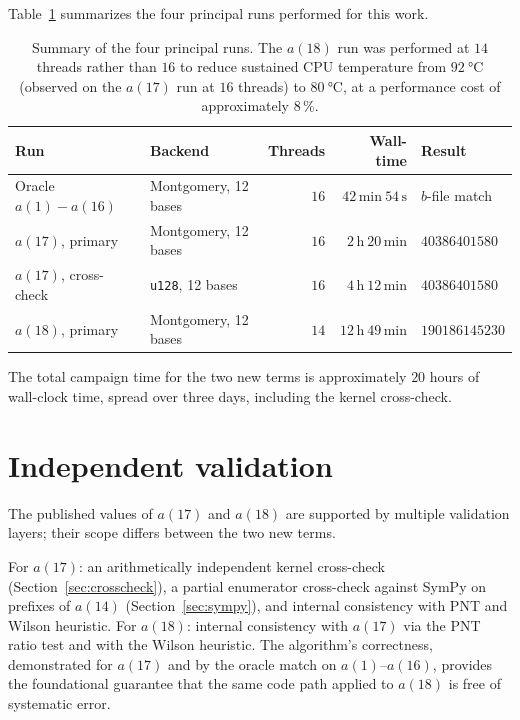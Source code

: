 \documentclass[11pt,a4paper]{article}
\theoremstyle{definition}
\begin{document}
Table~\ref{tab:campaign} summarizes the four principal runs performed for
this work.

\begin{table}[ht]
  \centering
  \small
  \begin{tabular}{l l r r l}
    \toprule
    Run                    & Backend       & Threads & Wall-time & Result\\
    \midrule
    Oracle $a(1)\!-\!a(16)$ & Montgomery, 12 bases & $16$ & $42\,\text{min}\ 54\,\text{s}$ & $b$-file match\\
    $a(17)$, primary        & Montgomery, 12 bases & $16$ & $2\,\text{h}\ 20\,\text{min}$ & $\num{40386401580}$\\
    $a(17)$, cross-check    & \texttt{u128}, 12 bases & $16$ & $4\,\text{h}\ 12\,\text{min}$ & $\num{40386401580}$\\
    $a(18)$, primary        & Montgomery, 12 bases & $14$ & $12\,\text{h}\ 49\,\text{min}$ & $\num{190186145230}$\\
    \bottomrule
  \end{tabular}
  \caption{Summary of the four principal runs. The $a(18)$ run was
    performed at $14$ threads rather than $16$ to reduce sustained
    CPU temperature from $\SI{92}{\celsius}$ (observed on the
    $a(17)$ run at $16$ threads) to $\SI{80}{\celsius}$, at a
    performance cost of approximately $8\,\%$.}
  \label{tab:campaign}
\end{table}

The total campaign time for the two new terms is approximately
$20$ hours of wall-clock time, spread over three days, including the
kernel cross-check.

\section{Independent validation}\label{sec:validation}

The published values of $a(17)$ and $a(18)$ are supported by
multiple validation layers; their scope differs between the two new terms.

For $a(17)$: an arithmetically independent kernel cross-check
(Section~\ref{sec:crosscheck}), a partial enumerator cross-check against
SymPy on prefixes of $a(14)$ (Section~\ref{sec:sympy}), and internal
consistency with PNT and Wilson heuristic. For $a(18)$: internal
consistency with $a(17)$ via the PNT ratio test and with the Wilson
heuristic. The algorithm's correctness, demonstrated for $a(17)$ and by
the oracle match on $a(1)$--$a(16)$, provides the foundational guarantee
that the same code path applied to $a(18)$ is free of systematic error.
\end{document}
